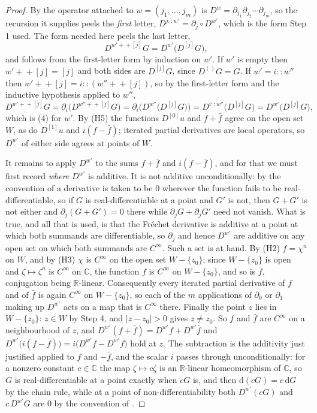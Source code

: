 \begin{proof}
By  the operator attached to $w=(j_1,\dots,j_m)$ is
$D^{w}=\partial_{j_1}\partial_{j_2}\cdots\partial_{j_m}$, so the recursion it
supplies peels the \emph{first} letter, $D^{j::w'}=\partial_j\circ D^{w'}$,
which is the form Step 1 used.  The form needed here peels the last letter,
\begin{equation}\tag{4}
  D^{w'+\!\!+[j]}G=D^{w'}\bigl(D^{[j]}G\bigr),
\end{equation}
and follows from the first-letter form by induction on $w'$.  If $w'$ is empty
then $w'\!+\!\!+[j]=[j]$ and both sides are $D^{[j]}G$, since
$D^{()}G=G$.  If $w'=i::w''$ then $w'\!+\!\!+[j]=i::(w''\!+\!\!+[j])$, so by
the first-letter form and the inductive hypothesis applied to $w''$,
\[
  D^{w'+\!\!+[j]}G=\partial_i\bigl(D^{w''+\!\!+[j]}G\bigr)
  =\partial_i\bigl(D^{w''}\bigl(D^{[j]}G\bigr)\bigr)
  =D^{i::w''}\bigl(D^{[j]}G\bigr)=D^{w'}\bigl(D^{[j]}G\bigr),
\]
which is (4) for $w'$.
By (H5) the functions $D^{[0]}u$ and $f+\bar f$ agree on the open set $W$, as
do $D^{[1]}u$ and $i(f-\bar f)$; iterated partial derivatives are local
operators, so $D^{w'}$ of either side agrees at points of $W$.

It remains to apply $D^{w'}$ to the sums $f+\bar f$ and $i(f-\bar f)$, and for
that we must first record \emph{where} $D^{w'}$ is additive.  It is not additive
unconditionally: by the convention of  a derivative is
taken to be $0$ wherever the function fails to be real-differentiable, so if $G$
is real-differentiable at a point and $G'$ is not, then $G+G'$ is not either and
$\partial_j(G+G')=0$ there while $\partial_jG+\partial_jG'$ need not vanish.
What is true, and all that is used, is that the Fréchet derivative is additive
at a point at which both summands are differentiable, so $\partial_j$ and hence
$D^{w'}$ are additive on any open set on which both summands are $C^\infty$.
Such a set is at hand.  By (H2) $f=\chi^{n}$ on $W$, and by (H3) $\chi$ is
$C^\infty$ on the open set $W-\{z_0\}$; since $W-\{z_0\}$ is open and
$\zeta\mapsto\zeta^{n}$ is $C^\infty$ on $\mathbb{C}$, the function $f$ is
$C^\infty$ on $W-\{z_0\}$, and so is $\bar f$, conjugation being
$\mathbb{R}$-linear.  Consequently every iterated partial derivative of $f$ and
of $\bar f$ is again $C^\infty$ on $W-\{z_0\}$, so each of the $m$ applications
of $\partial_0$ or $\partial_1$ making up $D^{w'}$ acts on a map that is
$C^\infty$ there.  Finally the point $z$ lies in $W-\{z_0\}$: $z\in W$ by
Step 4, and $|z-z_0|>0$ gives $z\neq z_0$.  So $f$ and $\bar f$ are $C^\infty$
on a neighbourhood of $z$, and $D^{w'}(f+\bar f)=D^{w'}f+D^{w'}\bar f$ and
$D^{w'}\bigl(i(f-\bar f)\bigr)=i\bigl(D^{w'}f-D^{w'}\bar f\bigr)$ hold at $z$.
The subtraction is the additivity just justified applied to $f$ and $-\bar f$,
and the scalar $i$ passes through unconditionally: for a nonzero constant
$c\in\mathbb{C}$ the map $\zeta\mapsto c\zeta$ is an $\mathbb{R}$-linear
homeomorphism of $\mathbb{C}$, so $G$ is real-differentiable at a point exactly
when $cG$ is, and then $\mathrm{d}(cG)=c\,\mathrm{d}G$ by the chain rule, while
at a point of non-differentiability both $D^{w'}(cG)$ and $c\,D^{w'}G$ are $0$
by the convention of .


\end{proof}
